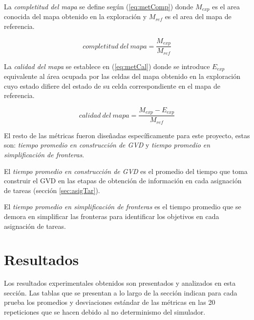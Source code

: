 
La \emph{completitud del mapa} se define según (\ref{eq:metComp}) donde
$M_{exp}$ es el area conocida del mapa obtenido en la exploración y $M_{ref}$
es el area del mapa de referencia.

\begin{equation} \label{eq:metComp}
completitud\ del\ mapa = \frac{M_{exp}}{M_{ref}}
\end{equation}

La \emph{calidad del mapa} se establece en (\ref{eq:metCal}) donde se introduce
$E_{exp}$ equivalente al área ocupada por las celdas del mapa obtenido en
la exploración cuyo estado difiere del estado de su celda correspondiente en el
mapa de referencia.

\begin{equation} \label{eq:metCal}
calidad\ del\ mapa = \frac{M_{exp}-E_{exp}}{M_{ref}}
\end{equation}

El resto de las métricas fueron diseñadas específicamente para este proyecto,
estas son: \emph{tiempo promedio en construcción de GVD} y \emph{tiempo
promedio en simplificación de fronteras}.

El \emph{tiempo promedio en construcción de GVD} es el promedio del tiempo que
toma construir el GVD en las etapas de obtención de información en cada
asignación de tareas (sección \ref{sec:asigTar}).

El \emph{tiempo promedio en simplificación de fronteras} es el tiempo promedio
que se demora en simplificar las fronteras para identificar los objetivos en
cada asignación de tareas.

\section{Resultados}
\newlength{\graphlen}
\setlength{\graphlen}{0.75\textwidth}


Los resultados experimentales obtenidos son presentados y analizados en esta
sección. Las tablas que se presentan a lo largo de la sección indican para cada
prueba los promedios y desviaciones estándar de las métricas en las 20
repeticiones que se hacen debido al no determinismo del simulador.

